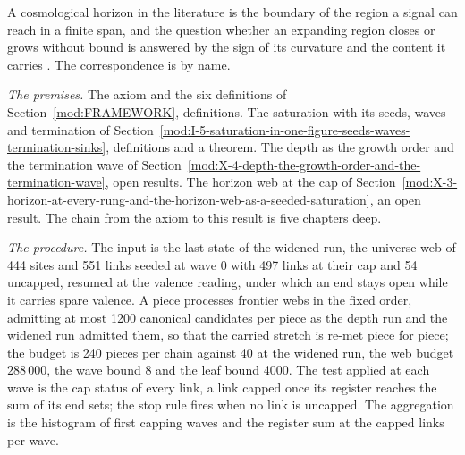 \begin{chbridge}
A cosmological horizon in the literature is the boundary of the region a signal can reach in a finite span, and the question whether an expanding region closes or grows without bound is answered by the sign of its curvature and the content it carries \cite{Friedmann1922,HawkingEllis1973}. The correspondence is by name.
\end{chbridge}
\begin{chproof}
\textit{The premises.} The axiom and the six definitions of Section~\ref{mod:FRAMEWORK}, definitions. The saturation with its seeds, waves and termination of Section~\ref{mod:I-5-saturation-in-one-figure-seeds-waves-termination-sinks}, definitions and a theorem. The depth as the growth order and the termination wave of Section~\ref{mod:X-4-depth-the-growth-order-and-the-termination-wave}, open results. The horizon web at the cap of Section~\ref{mod:X-3-horizon-at-every-rung-and-the-horizon-web-as-a-seeded-saturation}, an open result. The chain from the axiom to this result is five chapters deep.

\textit{The procedure.} The input is the last state of the widened run, the universe web of 444 sites and 551 links seeded at wave 0 with 497 links at their cap and 54 uncapped, resumed at the valence reading, under which an end stays open while it carries spare valence. A piece processes frontier webs in the fixed order, admitting at most 1200 canonical candidates per piece as the depth run and the widened run admitted them, so that the carried stretch is re-met piece for piece; the budget is 240 pieces per chain against 40 at the widened run, the web budget $288\,000$, the wave bound 8 and the leaf bound 4000. The test applied at each wave is the cap status of every link, a link capped once its register reaches the sum of its end sets; the stop rule fires when no link is uncapped. The aggregation is the histogram of first capping waves and the register sum at the capped links per wave.


\end{chproof}
